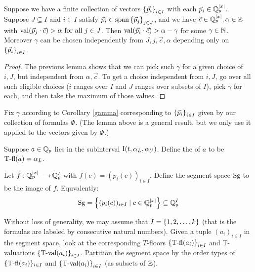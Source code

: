 \begin{Corollary}	 \label{gamma}
  Suppose we have a finite collection of vectors $\left\{\vec p_i\right\}_{i \in I}$ with each $\vec p_i \in \mathbb{Q}_p^{|x|}$.
  Suppose $J \subseteq I$ and $i \in I$ satisfy $\vec p_i \in \operatorname{span} \left\{\vec p_j\right\}_{j \in J}$,
  and we have $\vec c \in \mathbb{Q}_p^{|x|}, \alpha \in \mathbb{Z}$ with $\operatorname{val}(\vec p_j \cdot \vec c) > \alpha \text{ for all } j \in J$.
  Then $\operatorname{val}(\vec p_i \cdot \vec c) > \alpha - \gamma$
  for some $\gamma \in \mathbb{N}$.
  Moreover $\gamma$ can be chosen independently from $J, j, \vec c, \alpha$ depending only on $\left\{\vec p_i\right\}_{i \in I}$.
\end{Corollary}
\begin{proof}
  The previous lemma shows that we can pick such $\gamma$ for a given choice of $i, J$, but independent from $\alpha, \vec c$.
  To get a choice independent from $i, J$, go over all such eligible choices 
  ($i$ ranges over $I$ and $J$ ranges over subsets of $I$),
  pick $\gamma$ for each, and then take the maximum of those values.  
\end{proof}

Fix $\gamma$ according to Corollary \ref{gamma} corresponding to $\left\{\vec p_i\right\}_{i \in I}$ given by our collection of formulas $\Phi$.
(The lemma above is a general result, but we only use it applied to the vectors given by $\Phi$.)

\begin{Definition}
  Suppose $a \in \mathbb{Q}_p$ lies in the subinterval $\operatorname{I}(t, \alpha_L, \alpha_U)$.
  Define the  of $a$ to be $\operatorname{T-fl}(a) = \alpha_L$.
\end{Definition}

\begin{Definition}
  Let $f: \mathbb{Q}_p^{|x|} \operatorname{\longrightarrow} \mathbb{Q}_p^I$ with $f(c) = (p_i(c))_{i \in I}$.
  Define the segment space $\operatorname{Sg}$ to be the image of $f$.
  Equvalently:
  \begin{align*}
    \operatorname{Sg} = \left\{(p_i(c))_{i \in I} \mid c \in \mathbb{Q}_p^{|x|}\right\} \subseteq \mathbb{Q}_p^I
  \end{align*}
\end{Definition}

Without loss of generality, we may assume that $I = \left\{1,2, \ldots, k\right\}$ (that is the formulas are labeled by consecutive natural numbers).
Given a tuple $(a_i)_{i\in I}$ in the segment space,
look at the corresponding $T$-floors $\left\{\operatorname{T-fl}(a_i)\right\}_{i\in I}$ and T-valuations $\left\{\operatorname{T-val}(a_i)\right\}_{i\in I}$.
Partition the segment space by the order types of $\{\operatorname{T-fl}(a_i)\}_{i\in I}$ and $\left\{\operatorname{T-val}(a_i)\right\}_{i\in I}$ (as subsets of $\mathbb{Z}$).

